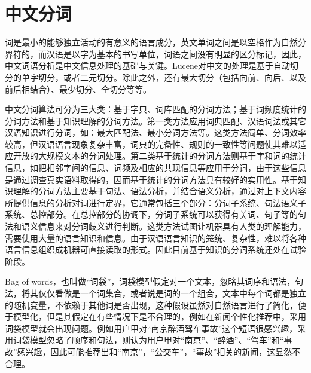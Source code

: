 \section{中文分词}
\par 词是最小的能够独立活动的有意义的语言成分，英文单词之间是以空格作为自然分界符的，而汉语是以字为基本的书写单位，词语之间没有明显的区分标记，因此，中文词语分析是中文信息处理的基础与关键。Lucene对中文的处理是基于自动切分的单字切分，或者二元切分。除此之外，还有最大切分（包括向前、向后、以及前后相结合）、最少切分、全切分等等。
\par 中文分词算法可分为三大类：基于字典、词库匹配的分词方法；基于词频度统计的分词方法和基于知识理解的分词方法。第一类方法应用词典匹配、汉语词法或其它汉语知识进行分词，如：最大匹配法、最小分词方法等。这类方法简单、分词效率较高，但汉语语言现象复杂丰富，词典的完备性、规则的一致性等问题使其难以适应开放的大规模文本的分词处理。第二类基于统计的分词方法则基于字和词的统计信息，如把相邻字间的信息、词频及相应的共现信息等应用于分词，由于这些信息是通过调查真实语料取得的，因而基于统计的分词方法具有较好的实用性。基于知识理解的分词方法主要基于句法、语法分析，并结合语义分析，通过对上下文内容所提供信息的分析对词进行定界，它通常包括三个部分：分词子系统、句法语义子系统、总控部分。在总控部分的协调下，分词子系统可以获得有关词、句子等的句法和语义信息来对分词歧义进行判断。这类方法试图让机器具有人类的理解能力，需要使用大量的语言知识和信息。由于汉语语言知识的笼统、复杂性，难以将各种语言信息组织成机器可直接读取的形式。因此目前基于知识的分词系统还处在试验阶段。
\par Bag of words，也叫做“词袋”，词袋模型假定对一个文本，忽略其词序和语法，句法，将其仅仅看做是一个词集合，或者说是词的一个组合，文本中每个词都是独立的随机变量，不依赖于其他词是否出现，这种假设虽然对自然语言进行了简化，便于模型化，但是其假定在有些情况下是不合理的，例如在新闻个性化推荐中，采用词袋模型就会出现问题。例如用户甲对“南京醉酒驾车事故”这个短语很感兴趣，采用词袋模型忽略了顺序和句法，则认为用户甲对“南京”、“醉酒”、“驾车”和“事故”感兴趣，因此可能推荐出和“南京”，“公交车”，“事故”相关的新闻，这显然不合理。
